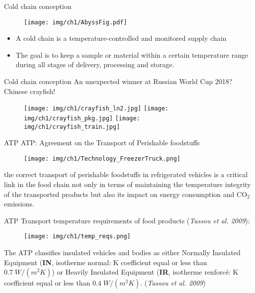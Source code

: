
\begin{frame}{Cold chain conception}
    \begin{figure}[ht]
        \centering
        \texttt{[image: img/ch1/AbyssFig.pdf]}    
    \end{figure}
    \begin{itemize}
    \item A cold chain is a temperature-controlled and monitored supply chain
    \item The goal is to keep a sample or material within a certain temperature range during all stages of delivery, processing and storage.
    \end{itemize}
\end{frame}


\begin{frame}{Cold chain conception}
An unexpected winner at Russian World Cup 2018? \\
\pause  \alert{Chinese crayfish!}
    \pause
    \begin{figure}[ht]
        \centering
        \texttt{[image: img/ch1/crayfish\_ln2.jpg]}
        \pause
        \texttt{[image: img/ch1/crayfish\_pkg.jpg]}
        \pause
        \texttt{[image: img/ch1/crayfish\_train.jpg]}
    \end{figure}

\end{frame}


\begin{frame}{ATP}
    ATP: Agreement on the Transport of Perishable foodstuffs
    \begin{figure}
        \centering
        \texttt{[image: img/ch1/Technology\_FreezerTruck.png]}
    \end{figure}
    \small{the correct transport of perishable foodstuffs in refrigerated vehicles is a critical link in the food chain not only in terms of maintaining the temperature integrity of the transported products but also its impact on energy consumption and CO$_2$ emissions. }
\end{frame}


\begin{frame}{ATP}
\small{Transport temperature requirements of food products (\textit{Tassou et al. 2009}):}
    \begin{figure}
        \centering
        \texttt{[image: img/ch1/temp\_reqs.png]}
    \end{figure}
    \scriptsize{The ATP classifies insulated vehicles and bodies as either Normally Insulated Equipment (\textbf{IN}, isotherme normal: K coefficient equal or less than $ 0.7\; W/(m^2 K) $) or Heavily Insulated Equipment (\textbf{IR}, isotherme renforcé: K coefficient equal or less than $ 0.4\; W/(m^2 K )$. (\textit{Tassou et al. 2009})}
\end{frame}



